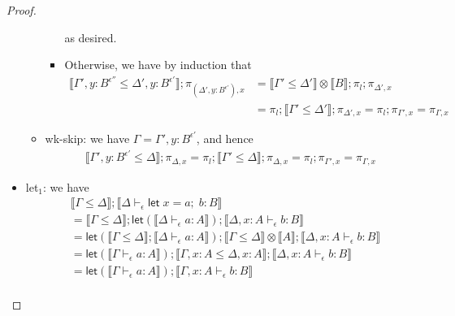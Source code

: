 \documentclass[acmsmall,screen,review]{acmart}
\newcommand{\ms}[1]{\ensuremath{\mathsf{#1}}}
\newcommand{\letexpr}[3]{\ensuremath{\ms{let}\;#1 = #2;\;#3}}
\newcommand{\thyp}[3]{#1 : {#2}^{#3}}
\newcommand{\bhyp}[2]{#1 : #2}
\newcommand{\hasty}[4]{#1 \vdash_{#2} #3: {#4}}
\newcommand{\brle}[1]{{\textsf{#1}}}
\newcommand{\dnt}[1]{\llbracket{#1}\rrbracket}
\newcommand{\lmor}[1]{\ms{let}(#1)}
\begin{document}
\begin{proof}
\begin{itemize}
\begin{itemize}
\begin{itemize}
\begin{equation}
        \end{equation}
        as desired.
        \item Otherwise, we have by induction that
        \begin{equation}
          \begin{aligned}
          \dnt{\Gamma', \thyp{y}{B}{\epsilon''} \leq \Delta', \thyp{y}{B}{\epsilon'}}
          ; \pi_{(\Delta', \thyp{y}{B}{\epsilon'}), x}
          & = \dnt{\Gamma' \leq \Delta'} \otimes \dnt{B} ; \pi_l ; \pi_{\Delta', x} \\
          & = \pi_l ; \dnt{\Gamma' \leq \Delta'} ; \pi_{\Delta', x}
          = \pi_l ; \pi_{\Gamma', x}
          = \pi_{\Gamma, x}
          \end{aligned}
        \end{equation}
      \end{itemize}
      \item \brle{wk-skip}: we have $\Gamma = \Gamma', \thyp{y}{B}{\epsilon'}$, and hence
      \begin{equation}
        \begin{aligned}
          \dnt{\Gamma', \thyp{y}{B}{\epsilon'} \leq \Delta} ; \pi_{\Delta, x}
          = \pi_l ; \dnt{\Gamma' \leq \Delta} ; \pi_{\Delta, x}
          = \pi_l ; \pi_{\Gamma', x}
          = \pi_{\Gamma, x}
        \end{aligned}
      \end{equation}
    \end{itemize}
    \item \brle{let$_1$}: we have
    \begin{equation}
      \begin{aligned}
        & \dnt{\Gamma \leq \Delta} ; \dnt{\hasty{\Delta}{\epsilon}{\letexpr{x}{a}{b}}{B}} \\
        & = \dnt{\Gamma \leq \Delta} 
          ; \lmor{\dnt{\hasty{\Delta}{\epsilon}{a}{A}}}
          ; \dnt{\hasty{\Delta, \bhyp{x}{A}}{\epsilon}{b}{B}} \\
        &= \lmor{\dnt{\Gamma \leq \Delta} ; \dnt{\hasty{\Delta}{\epsilon}{a}{A}}}
        ; \dnt{\Gamma \leq \Delta} \otimes \dnt{A}
        ; \dnt{\hasty{\Delta, \bhyp{x}{A}}{\epsilon}{b}{B}} \\
        &= \lmor{\dnt{\hasty{\Gamma}{\epsilon}{a}{A}}}
        ; \dnt{\Gamma, \bhyp{x}{A} \leq \Delta, \bhyp{x}{A}}
        ; \dnt{\hasty{\Delta, \bhyp{x}{A}}{\epsilon}{b}{B}} \\
        &= \lmor{\dnt{\hasty{\Gamma}{\epsilon}{a}{A}}}
        ; \dnt{\hasty{\Gamma, \bhyp{x}{A}}{\epsilon}{b}{B}} \\

\end{aligned}
\end{equation}
\end{itemize}
\end{proof}
\end{document}

